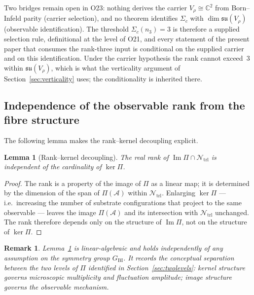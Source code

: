 \documentclass[11pt,a4paper]{article}
\newtheorem{lemma}[theorem]{Lemma}
\newtheorem{remark}[theorem]{Remark}
\newcommand{\Ntrl}{\mathcal{N}_{\mathrm{trl}}}
\newcommand{\Aadm}{\mathcal{A}}
\newcommand{\GBI}{G_{\mathrm{BI}}}
\begin{document}
      Two bridges remain open in O23: nothing derives the carrier $V_\rho \cong \mathbb{C}^2$
      from Born--Infeld parity (carrier selection), and no theorem identifies $\Sigma_c$ with
      $\dim \mathfrak{su}(V_\rho)$ (observable identification).
      The threshold $\Sigma_c(n_3) = 3$ is therefore a supplied selection rule, definitional at
      the level of O21, and every statement of the present paper that consumes the rank-three
      input is conditional on the supplied carrier and on this identification.
      Under the carrier hypothesis the rank cannot exceed~$3$ within $\mathfrak{su}(V_\rho)$,
      which is what the verticality argument of Section~\ref{sec:verticality} uses; the
      conditionality is inherited there.

    \subsection{Independence of the observable rank from the fibre structure}
      \label{sec:independence}

      The following lemma makes the rank--kernel decoupling explicit.

      \begin{lemma}[Rank--kernel decoupling]
        \label{lem:decoupling}
        The real rank of $\operatorname{Im}\Pi \cap \Ntrl$ is independent of the cardinality of
        $\ker\Pi$.
      \end{lemma}

      \begin{proof}
        The rank is a property of the image of $\Pi$ as a linear map; it is determined by the dimension
        of the span of $\Pi(\Aadm)$ within $\Ntrl$.
        Enlarging $\ker\Pi$ --- i.e.\ increasing the number of substrate configurations that project to
        the same observable --- leaves the image $\Pi(\Aadm)$ and its intersection with $\Ntrl$
        unchanged.
        The rank therefore depends only on the structure of $\operatorname{Im}\Pi$, not on the
        structure of $\ker\Pi$.
      \end{proof}

      \begin{remark}
        Lemma~\ref{lem:decoupling} is linear-algebraic and holds independently of any assumption on
        the symmetry group $\GBI$.
        It records the conceptual separation between the two levels of $\Pi$ identified in
        Section~\ref{sec:twolevels}: kernel structure governs microscopic multiplicity and
        fluctuation amplitude; image structure governs the observable mechanism.
      \end{remark}
\end{document}
